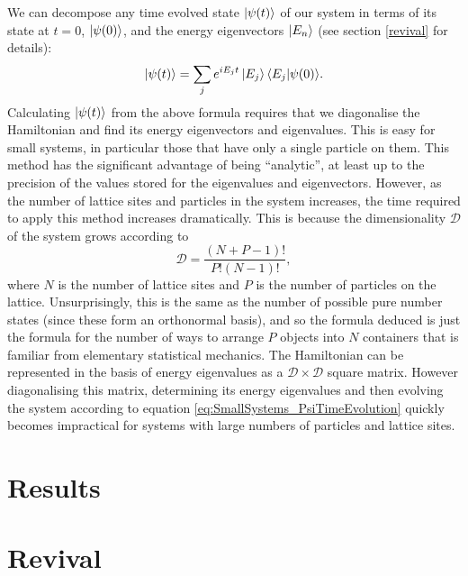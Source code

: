 \documentclass[prb, twocolumn, final]{revtex4-1}
\theoremstyle{plain}
\begin{document}
We can decompose any time evolved state $\ket{\psi(t)}$ of our system in terms
of its state at $t=0$, $\ket{\psi(0)}$, and the energy eigenvectors $\ket{E_n}$
(see section \ref{revival} for details):
\begin{equation}
    \label{eq:SmallSystems_PsiTimeEvolution}
    \ket{\psi(t)} = \sum_{j}{e^{i E_{j}t} \ket{E_{j}} \braket{E_{j}|\psi(0)}}.
\end{equation}
Calculating $\ket{\psi(t)}$ from the above formula requires that we diagonalise
the Hamiltonian and find its energy eigenvectors and eigenvalues. This is easy
for small systems, in particular those that have only a single particle on them.
This method has the significant advantage of being ``analytic'', at least up to
the precision of the values stored for the eigenvalues and eigenvectors.
However, as the number of lattice sites and
particles in the system increases, the time required to apply this method
increases dramatically. This is because the dimensionality $\mathcal{D}$ of the
system grows according to
\begin{equation}
    \label{dimensionality_exact}
    \mathcal{D} = \frac{(N + P - 1)!}{P! (N-1)!},
\end{equation}
where $N$ is the number of lattice sites and $P$ is the number of particles on
the lattice. Unsurprisingly, this is the same as the number of possible pure
number states (since these form an orthonormal basis), and so the formula
deduced is just the formula for the number of ways to arrange $P$ objects into
$N$ containers that is familiar from elementary statistical mechanics.
The Hamiltonian can be represented in the basis of energy eigenvalues as a
$\mathcal{D} \times \mathcal{D}$ square matrix. However diagonalising this
matrix, determining its energy eigenvalues and then evolving the system
according to equation \eqref{eq:SmallSystems_PsiTimeEvolution} quickly becomes
impractical for systems with large numbers of particles and lattice sites.


\section{Results}

\section{Revival \label{revival}}
\end{document}
